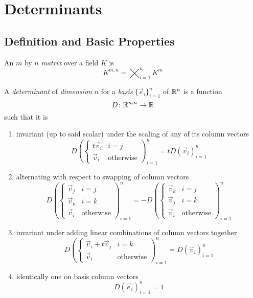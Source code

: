 \documentclass[notes]{subfiles}
\begin{document}
\setcounter{section}{4}
\section{Determinants}
\subsection{Definition and Basic Properties}
\begin{definition}[Matrix]
    An $m$ by $n$ \textit{matrix} over a field $K$ is
    \[
        K^{m, n} = \bigtimes_{i = 1}^n K^m
    \]
\end{definition}

\begin{definition}[Determinant]
    A \textit{determinant} of \textit{dimension} $n$ for a \textit{basis} $\{ \vec{e}_i \}_{i = 1}^n$ of $\mathbb{R}^n$ is a function
    \[
        D\colon \mathbb{R}^{n, n} \to \mathbb{R}
    \]
    such that it is
    \begin{enumerate}[label = (\arabic*)]
        \item invariant (up to said scalar) under the scaling of any of its column vectors
        \[
            D\left(\begin{cases} 
                t\vec{v}_i & i = j \\
                \vec{v}_i & \text{otherwise}
            \end{cases}
            \right)_{i = 1}^n = tD(\vec{v}_i)_{i = 1}^n
        \]
        \item alternating with respect to swapping of column vectors
        \[
            D\left(\begin{cases}
                \vec{v}_j & i = j \\
                \vec{v}_k & i = k \\
                \vec{v}_i & \text{otherwise}
            \end{cases}\right)_{i = 1}^n
            =
            -D\left(\begin{cases}
                \vec{v}_k & i = j \\
                \vec{v}_j & i = k \\
                \vec{v}_i & \text{otherwise}
            \end{cases}\right)_{i = 1}^n
        \]
        \item invariant under adding linear combinations of column vectors together
        \[
            D\left(\begin{cases}
                \vec{v}_i + t\vec{v}_j & i = k \\
                \vec{v}_i & \text{otherwise}
            \end{cases}\right)_{i = 1}^n = D(\vec{v}_i)_{i = 1}^n
        \]
        \item identically one on basis column vectors
        \[
            D(\vec{e}_i)_{i = 1}^n = 1
        \]
    \end{enumerate}
\end{definition}
\end{document}
